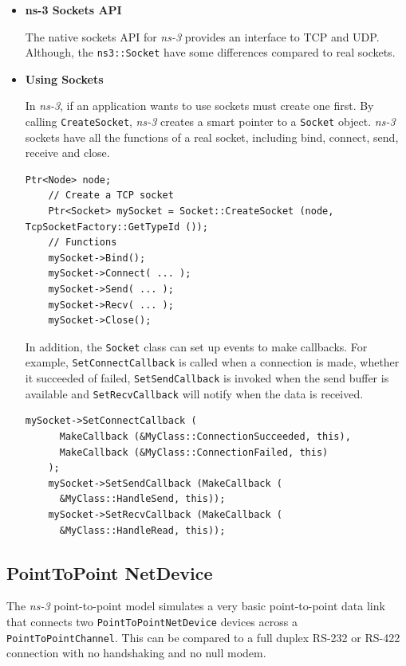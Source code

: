 \begin{itemize}
  \item \textbf{ns-3 Sockets API} 
  
  The native sockets API for \textit{ns-3} provides an interface 
  to TCP and UDP. Although, the \texttt{ns3::Socket} have some differences compared to
  real sockets. 

  \item \textbf{Using Sockets} 

  In \textit{ns-3}, if an application wants to use sockets must create one first. By 
  calling \texttt{CreateSocket}, \textit{ns-3} creates a smart pointer to a \texttt{Socket} object.
  \textit{ns-3} sockets have all the functions of a real socket, including bind, connect, send, receive
  and close.

  \begin{lstlisting}[language=myC++, caption={ns-3 Socket programming}, captionpos=b]
    Ptr<Node> node;
    // Create a TCP socket
    Ptr<Socket> mySocket = Socket::CreateSocket (node, TcpSocketFactory::GetTypeId ());
    // Functions
    mySocket->Bind();
    mySocket->Connect( ... );
    mySocket->Send( ... );
    mySocket->Recv( ... );
    mySocket->Close();
  \end{lstlisting}

  In addition, the \texttt{Socket} class can set up events to make callbacks. For example, 
  \texttt{SetConnectCallback} is called when a connection is made, whether it succeeded of 
  failed, \texttt{SetSendCallback} is invoked when the send buffer is available
  and \texttt{SetRecvCallback} will notify when the data is received.

  \begin{lstlisting}[language=myC++, caption={Socket callbacks}, captionpos=b]
    mySocket->SetConnectCallback (
      MakeCallback (&MyClass::ConnectionSucceeded, this),
      MakeCallback (&MyClass::ConnectionFailed, this)
    );
    mySocket->SetSendCallback (MakeCallback (
      &MyClass::HandleSend, this));
    mySocket->SetRecvCallback (MakeCallback (
      &MyClass::HandleRead, this));
  \end{lstlisting}
\end{itemize}

\subsection{PointToPoint NetDevice}
The \textit{ns-3} point-to-point model simulates a very basic point-to-point data link that connects 
two \texttt{PointToPointNetDevice} devices across a \texttt{PointToPointChannel}. This can be compared to a 
full duplex RS-232 or RS-422 connection with no handshaking and no null modem.

